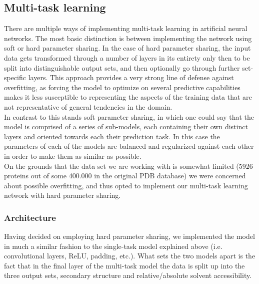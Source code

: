 \begin{multicols}{2}
\subsection{Multi-task learning}
There are multiple ways of implementing multi-task learning in artificial neural networks. The most basic distinction is between implementing the network using soft or hard parameter sharing. In the case of hard parameter sharing, the input data gets transformed through a number of layers in its entirety only then to be split into distinguishable output sets, and then optionally go through further set-specific layers. This approach provides a very strong line of defense against overfitting, as forcing the model to optimize on several predictive capabilities makes it less  susceptible to representing the aspects of the training data that are not representative of general tendencies in the domain. \\
In contrast to this stands soft parameter sharing, in which one could say that the model is comprised of a series of sub-models, each containing their own distinct layers and oriented towards each their prediction task. In this case the parameters of each of the models are balanced and regularized against each other in order to make them as similar as possible. \citep{ruder-2017}\\
On the grounds that the data set we are working with is somewhat limited (5926 proteins out of some 400.000 in the original PDB database) we were concerned about possible overfitting, and thus opted to implement our multi-task learning network with hard parameter sharing.

\subsubsection{Architecture}
Having decided on employing hard parameter sharing, we implemented the model in much a similar fashion to the single-task model explained above (i.e. convolutional layers, ReLU, padding, etc.). What sets the two models apart is the fact that in the final layer of the multi-task model the data is split up into the three output sets, secondary structure and relative/absolute solvent accessibility.\\
\\


\end{multicols}
